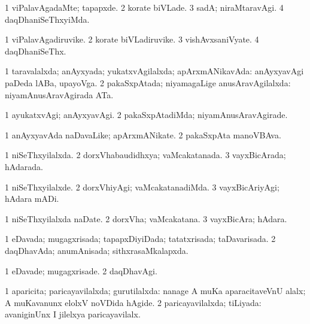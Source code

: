\bentry
{} 
\gl{\kirxvi}
\expl{}
\bmng
\bnum
\num{1} viPalavAgadaMte; tapapxde. 
\num{2} korate biVLade. 
\num{3} sadA; niraMtaravAgi. 
\num{4} daqDhaniSeThxyiMda. 
\enum
\emng
\eentry

\bentry
{} 
\gl{\nA}
\expl{}
\bmng
\bnum
\num{1} viPalavAgadiruvike. 
\num{2} korate biVLadiruvike. 
\num{3} vishAvxsaniVyate. 
\num{4} daqDhaniSeThx. 
\enum
\emng
\eentry

\bentry
{} 
\gl{\gu}
\bmng
\bnum
\num{1} taravalalxda; anAyxyada; yukatxvAgilalxda; apArxmANikavAda:  anAyxyavAgi paDeda lABa, upayoVga. 
\num{2} pakaSxpAtada; niyamagaLige anusAravAgilalxda:  niyamAnusAravAgirada ATa. 
\enum
\emng
\eentry

\bentry
{} 
\gl{\kirxvi}
\expl{}
\bmng
\bnum
\num{1} ayukatxvAgi; anAyxyavAgi. 
\num{2} pakaSxpAtadiMda; niyamAnusAravAgirade. 
\enum
\emng
\eentry

\bentry
{} 
\gl{\nA}
\expl{}
\bmng
\bnum
\num{1} anAyxyavAda naDavaLike; apArxmANikate. 
\num{2} pakaSxpAta manoVBAva. 
\enum
\emng
\eentry

\bentry
{} 
\gl{\gu}
\expl{}
\bmng
\bnum
\num{1} niSeThxyilalxda. 
\num{2} dorxVhabaudidhxya; vaMcakatanada. 
\num{3} vayxBicArada; hAdarada. 
\enum
\emng
\eentry

\bentry
{} 
\gl{\kirxvi}
\expl{}
\bmng
\bnum
\num{1} niSeThxyilalxde. 
\num{2} dorxVhiyAgi; vaMcakatanadiMda. 
\num{3} vayxBicAriyAgi; hAdara mADi. 
\enum
\emng
\eentry

\bentry
{} 
\gl{\nA}
\expl{}
\bmng
\bnum
\num{1} niSeThxyilalxda naDate. 
\num{2} dorxVha; vaMcakatana. 
\num{3} vayxBicAra; hAdara. 
\enum
\emng
\eentry

\bentry
{} 
\gl{\gu}
\expl{}
\bmng
\bnum
\num{1} eDavada; mugagxrisada; tapapxDiyiDada; tatatxrisada; taDavarisada. 
\num{2} daqDhavAda; anumAnisada; sithxrasaMkalapxda. 
\enum
\emng
\eentry

\bentry
{} 
\gl{\kirxvi}
\expl{}
\bmng
\bnum
\num{1} eDavade; mugagxrisade. 
\num{2} daqDhavAgi. 
\enum
\emng
\eentry

\bentry
{} 
\gl{\gu}
\expl{}
\bmng
\bnum
\num{1} aparicita; paricayavilalxda; gurutilalxda:  nanage A muKa aparacitaveVnU alalx; A muKavanunx elolxV noVDida hAgide. 
\num{2} paricayavilalxda; tiLiyada:  avaniginUnx I jilelxya paricayavilalx. 
\enum
\emng
\eentry

